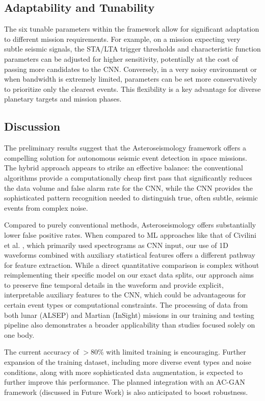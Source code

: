 \documentclass[conference]{IEEEtran}
\begin{document}
\subsection{Adaptability and Tunability}
The six tunable parameters within the framework allow for significant adaptation to different mission requirements. For example, on a mission expecting very subtle seismic signals, the STA/LTA trigger thresholds and characteristic function parameters can be adjusted for higher sensitivity, potentially at the cost of passing more candidates to the CNN. Conversely, in a very noisy environment or when bandwidth is extremely limited, parameters can be set more conservatively to prioritize only the clearest events. This flexibility is a key advantage for diverse planetary targets and mission phases.

\subsection{Discussion}
The preliminary results suggest that the Asteroseismology framework offers a compelling solution for autonomous seismic event detection in space missions. The hybrid approach appears to strike an effective balance: the conventional algorithms provide a computationally cheap first pass that significantly reduces the data volume and false alarm rate for the CNN, while the CNN provides the sophisticated pattern recognition needed to distinguish true, often subtle, seismic events from complex noise.

Compared to purely conventional methods, Asteroseismology offers substantially lower false positive rates. When compared to ML approaches like that of Civilini et al. \cite{favPaper}, which primarily used spectrograms as CNN input, our use of 1D waveforms combined with auxiliary statistical features offers a different pathway for feature extraction. While a direct quantitative comparison is complex without reimplementing their specific model on our exact data splits, our approach aims to preserve fine temporal details in the waveform and provide explicit, interpretable auxiliary features to the CNN, which could be advantageous for certain event types or computational constraints. The processing of data from both lunar (ALSEP) and Martian (InSight) missions in our training and testing pipeline also demonstrates a broader applicability than studies focused solely on one body.

The current accuracy of $>$80\% with limited training is encouraging. Further expansion of the training dataset, including more diverse event types and noise conditions, along with more sophisticated data augmentation, is expected to further improve this performance. The planned integration with an AC-GAN framework (discussed in Future Work) is also anticipated to boost robustness.
\end{document}
